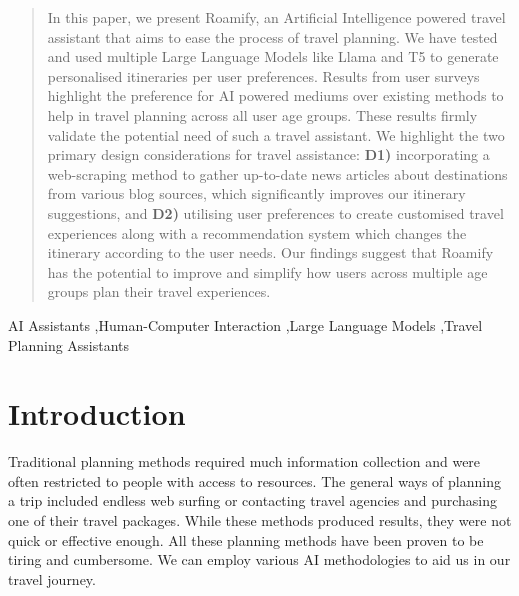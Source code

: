 \documentclass[final,1p,times]{elsarticle}
\begin{document}
\begin{frontmatter}
\begin{abstract}
    In this paper, we present Roamify, an Artificial Intelligence powered travel assistant that aims to ease the process of travel planning. We have tested and used multiple Large Language Models like Llama and T5 to generate personalised itineraries per user preferences. Results from user surveys highlight the preference for AI powered mediums over existing methods to help in travel planning across all user age groups. These results firmly validate the potential need of such a travel assistant. We highlight the two primary design considerations for travel assistance: \textbf{D1)} incorporating a web-scraping method to gather up-to-date news articles about  destinations from various blog sources, which significantly improves our itinerary suggestions, and \textbf{D2)} utilising user preferences to create customised travel experiences along with a recommendation system which changes the itinerary according to the user needs. Our findings suggest that Roamify has the potential to improve and simplify how users across multiple age groups plan their travel experiences.
\end{abstract}

\begin{keyword}
AI Assistants \sep Human-Computer Interaction \sep Large Language Models \sep Travel Planning Assistants
\end{keyword}

\end{frontmatter}







\section{Introduction}
    Traditional planning methods required much information collection and were often restricted to people with access to resources. The general ways of planning a trip included endless web surfing or contacting travel agencies and purchasing one of their travel packages. While these methods produced results, they were not quick or effective enough. All these planning methods have been proven to be tiring and cumbersome. We can employ various AI methodologies to aid us in our travel journey\cite{intro1}.
    
\end{document}
